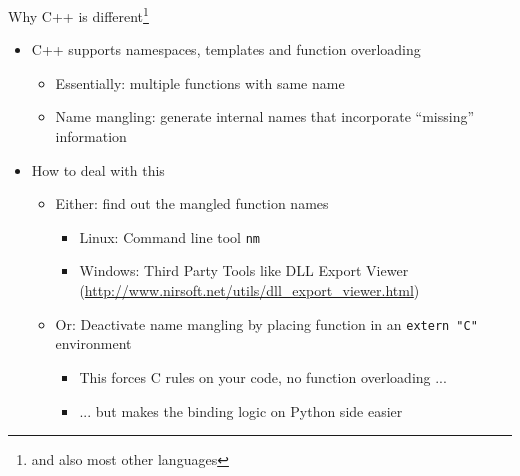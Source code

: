 
\begin{frame}{Why C++ is different\footnote{and also most other languages}}
%
\begin{itemize}
\item C++ supports namespaces, templates and function overloading
	\begin{itemize}
	\item Essentially: multiple functions with same name
	\item Name mangling: generate internal names that incorporate \enquote{missing} information
	\end{itemize}
\item How to deal with this
	\begin{itemize}
	\item Either: find out the mangled function names
		\begin{itemize}
		\item Linux: Command line tool \texttt{nm}
		\item Windows: Third Party Tools like DLL Export Viewer (\url{http://www.nirsoft.net/utils/dll_export_viewer.html})
		\end{itemize}
	\item Or: Deactivate name mangling by placing function in an \texttt{extern "C"} environment
		\begin{itemize}
		\item This forces C rules on your code, \ie no function overloading ...
		\item ... but makes the binding logic on Python side easier
		\end{itemize}
	\end{itemize}
\end{itemize}
%
\end{frame}


